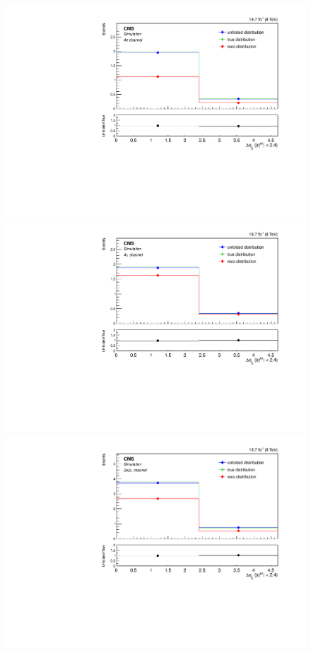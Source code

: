 \begin{figure}[hbtp]
\begin{center}
    \includegraphics[width=0.8\cmsFigWidth]{Figures/Unfolding/MCTests/CentralDeta_ZZTo4e_PowMatrix_PowDistr_HalfSample_fr}     
    \includegraphics[width=0.8\cmsFigWidth]{Figures/Unfolding/MCTests/CentralDeta_ZZTo4m_PowMatrix_PowDistr_HalfSample_fr}     
 \includegraphics[width=0.8\cmsFigWidth]{Figures/Unfolding/MCTests/CentralDeta_ZZTo2e2m_PowMatrix_PowDistr_HalfSample_fr}        

\end{center}
\end{figure}
